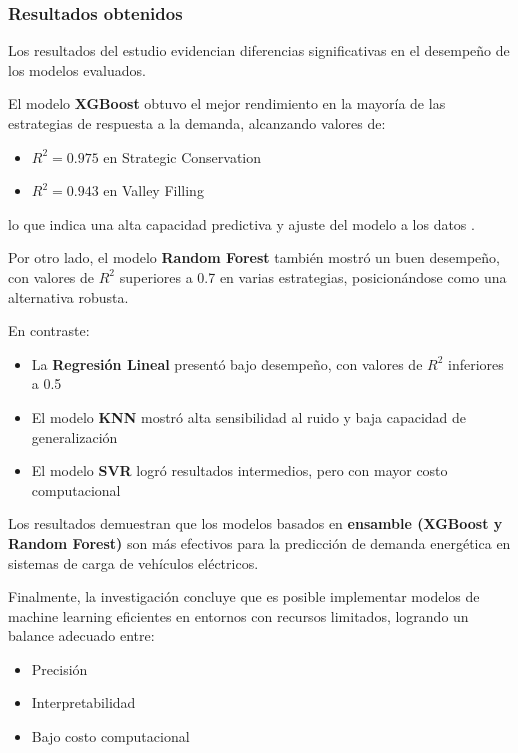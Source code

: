 \subsubsection{Resultados obtenidos}

Los resultados del estudio evidencian diferencias significativas en el desempeño de los modelos evaluados.

El modelo \textbf{XGBoost} obtuvo el mejor rendimiento en la mayoría de las estrategias de respuesta a la demanda, alcanzando valores de:

\begin{itemize}
    \item $R^2 = 0.975$ en Strategic Conservation
    \item $R^2 = 0.943$ en Valley Filling
\end{itemize}

lo que indica una alta capacidad predictiva y ajuste del modelo a los datos \cite{durrani2026}.

Por otro lado, el modelo \textbf{Random Forest} también mostró un buen desempeño, con valores de $R^2$ superiores a 0.7 en varias estrategias, posicionándose como una alternativa robusta.

En contraste:

\begin{itemize}
    \item La \textbf{Regresión Lineal} presentó bajo desempeño, con valores de $R^2$ inferiores a 0.5
    \item El modelo \textbf{KNN} mostró alta sensibilidad al ruido y baja capacidad de generalización
    \item El modelo \textbf{SVR} logró resultados intermedios, pero con mayor costo computacional
\end{itemize}

Los resultados demuestran que los modelos basados en \textbf{ensamble (XGBoost y Random Forest)} son más efectivos para la predicción de demanda energética en sistemas de carga de vehículos eléctricos.

Finalmente, la investigación concluye que es posible implementar modelos de machine learning eficientes en entornos con recursos limitados, logrando un balance adecuado entre:

\begin{itemize}
    \item Precisión
    \item Interpretabilidad
    \item Bajo costo computacional
\end{itemize}

